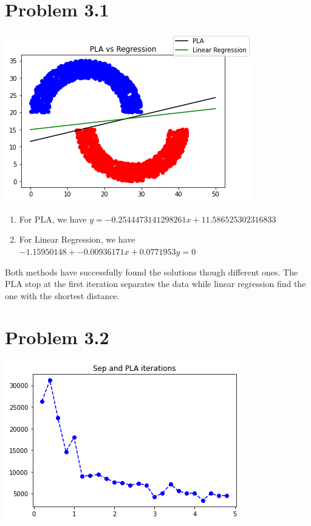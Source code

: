 \documentclass{article}
\def\math#1{$#1$}
\begin{document}
\section{Problem 3.1}

\includegraphics[]{3.1/1}

\begin{enumerate}
    \item For PLA, we have \math{y = -0.2544473141298261x + 11.586525302316833}
    \item For Linear Regression, we have \math{-1.15950148 + -0.00936171x + 0.0771953y = 0}
\end{enumerate}

Both methods have successfully found the solutions though different ones. The PLA stop at the first iteration separates the data while linear regression find the one with the shortest distance.

\section{Problem 3.2}

\includegraphics[]{3.2/1}
\end{document}
